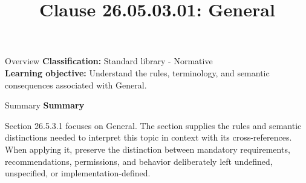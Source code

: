 \documentclass[10pt,letterpaper]{article}
\title{Clause 26.05.03.01: General}
\author{}
\date{}
\begin{document}
\maketitle
\begin{CornellOverviewBox}{Overview}
\textbf{Classification:} Standard library - Normative\\[2pt]
\textbf{Learning objective:} Understand the rules, terminology, and semantic consequences associated with General.
\end{CornellOverviewBox}\begin{CornellSummaryBox}{Summary}
{\sffamily\bfseries\color{Accent} Summary}\par\vspace{3pt}Section 26.5.3.1 focuses on General. The section supplies the rules and semantic distinctions needed to interpret this topic in context with its cross-references. When applying it, preserve the distinction between mandatory requirements, recommendations, permissions, and behavior deliberately left undefined, unspecified, or implementation-defined.
\end{CornellSummaryBox}
\end{document}
